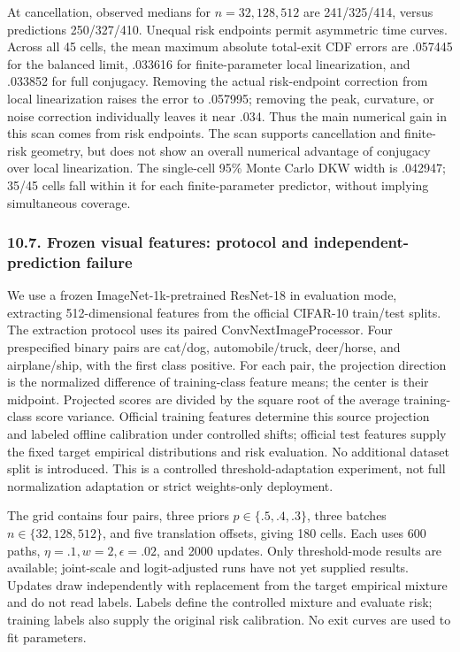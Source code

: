 At cancellation, observed medians for \(n=32,128,512\) are 241/325/414,
versus predictions 250/327/410. Unequal risk endpoints permit asymmetric
time curves. Across all 45 cells, the mean maximum absolute total-exit
CDF errors are .057445 for the balanced limit, .033616 for
finite-parameter local linearization, and .033852 for full conjugacy.
Removing the actual risk-endpoint correction from local linearization
raises the error to .057995; removing the peak, curvature, or noise
correction individually leaves it near .034. Thus the main numerical
gain in this scan comes from risk endpoints. The scan supports
cancellation and finite-risk geometry, but does not show an overall
numerical advantage of conjugacy over local linearization. The
single-cell 95\% Monte Carlo DKW width is .042947; 35/45 cells fall
within it for each finite-parameter predictor, without implying
simultaneous coverage.

\subsubsection{10.7. Frozen visual features: protocol and
independent-prediction
failure}\label{experiments-frozen-visual-features-protocol-and-independent-prediction-failure}

We use a frozen ImageNet-1k-pretrained ResNet-18 in evaluation mode,
extracting 512-dimensional features from the official CIFAR-10
train/test splits. The extraction protocol uses its paired
ConvNextImageProcessor. Four prespecified binary pairs are cat/dog,
automobile/truck, deer/horse, and airplane/ship, with the first class
positive. For each pair, the projection direction is the normalized
difference of training-class feature means; the center is their
midpoint. Projected scores are divided by the square root of the average
training-class score variance. Official training features determine this
source projection and labeled offline calibration under controlled
shifts; official test features supply the fixed target empirical
distributions and risk evaluation. No additional dataset split is
introduced. This is a controlled threshold-adaptation experiment, not
full normalization adaptation or strict weights-only deployment.

The grid contains four pairs, three priors \(p\in\{.5,.4,.3\}\), three
batches \(n\in\{32,128,512\}\), and five translation offsets, giving 180
cells. Each uses 600 paths, \(\eta=.1,w=2,\epsilon=.02\), and 2000
updates. Only threshold-mode results are available; joint-scale and
logit-adjusted runs have not yet supplied results. Updates draw
independently with replacement from the target empirical mixture and do
not read labels. Labels define the controlled mixture and evaluate risk;
training labels also supply the original risk calibration. No exit
curves are used to fit parameters.

